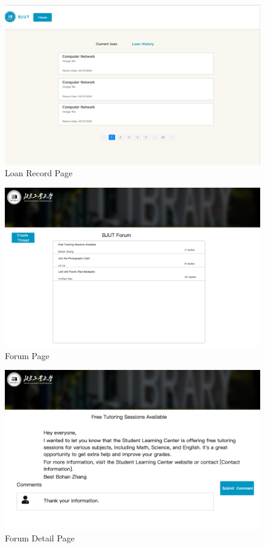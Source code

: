 \documentclass[12pt]{article}
\begin{document}
\begin{figure}[H]
    \centering
    \includegraphics[width=\textwidth]{mockups/common/loanrecord.png}
    \caption{Loan Record Page}
    \label{fig:loanrecord_page}
\end{figure}

\begin{figure}[H]
    \centering
    \includegraphics[width=\textwidth]{mockups/common/forum.png}
    \caption{Forum Page}
    \label{fig:forum_page}
\end{figure}

\begin{figure}[H]
    \centering
    \includegraphics[width=\textwidth]{mockups/common/forumdetail.png}
    \caption{Forum Detail Page}
    \label{fig:forudetail_page}
\end{figure}
\end{document}

